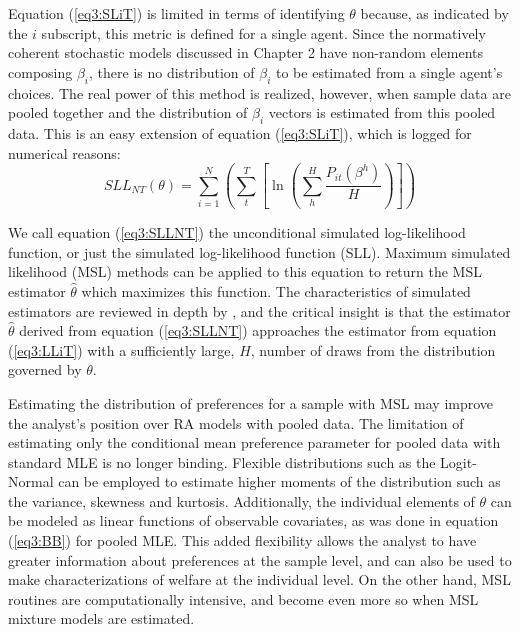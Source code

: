 \documentclass[../main.tex]{subfiles}
\begin{document}
Equation (\ref{eq3:SLiT}) is limited in terms of identifying $\theta$ because, as indicated by the $i$ subscript, this metric is defined for a single agent.
Since the normatively coherent stochastic models discussed in Chapter 2 have non-random elements composing $\beta_i$, there is no distribution of $\beta_i$ to be estimated from a single agent's choices.
The real power of this method is realized, however, when sample data are pooled together and the distribution of $\beta_i$ vectors is estimated from this pooled data.
This is an easy extension of equation (\ref{eq3:SLiT}), which is logged for numerical reasons:
\begin{equation}
	\label{eq3:SLLNT}
	\mathit{SLL}_{NT}(\theta) = \sum_{i=1}^N \left( \sum_t^T \left[ \ln\!\left( \sum_h^H \frac{ P_{it}(\beta^h) }{H} \right) \right] \right)
\end{equation}

\noindent We call equation (\ref{eq3:SLLNT}) the unconditional simulated log-likelihood function, or just the simulated log-likelihood function (SLL).
Maximum simulated likelihood (MSL) methods can be applied to this equation to return the MSL estimator $\hat{\theta}$ which maximizes this function.
The characteristics of simulated estimators are reviewed in depth by \textcite[Chapter~10]{Train2002}, and the critical insight is that the estimator $\hat{\theta}$ derived from equation (\ref{eq3:SLLNT}) approaches the estimator from equation (\ref{eq3:LLiT}) with a sufficiently large, $H$, number of draws from the distribution governed by $\theta$.

Estimating the distribution of preferences for a sample with MSL may improve the analyst's position over RA models with pooled data.
The limitation of estimating only the conditional mean preference parameter for pooled data with standard MLE is no longer binding.
Flexible distributions such as the Logit-Normal{\footnotemark} can be employed to estimate higher moments of the distribution such as the variance, skewness and kurtosis.
Additionally, the individual elements of $\theta$ can be modeled as linear functions of observable covariates, as was done in equation (\ref{eq3:BB}) for pooled MLE.
This added flexibility allows the analyst to have greater information about preferences at the sample level, and can also be used to make characterizations of welfare at the individual level.
On the other hand, MSL routines are computationally intensive, and become even more so when MSL mixture models are estimated.

\addtocounter{footnote}{-1}
\end{document}
